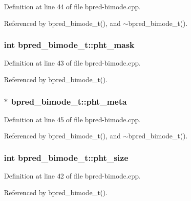 Definition at line 44 of file bpred-bimode.cpp.

Referenced by bpred\_\-bimode\_\-t(), and $\sim$bpred\_\-bimode\_\-t().
\subsubsection[{pht\_\-mask}]{\setlength{\rightskip}{0pt plus 5cm}int {\bf bpred\_\-bimode\_\-t::pht\_\-mask}\hspace{0.3cm}{\tt  [protected]}}\label{classbpred__bimode__t_26046f46378232e197b7b46dd48a1f72}




Definition at line 43 of file bpred-bimode.cpp.

Referenced by bpred\_\-bimode\_\-t().
\subsubsection[{pht\_\-meta}]{$\ast$ {\bf bpred\_\-bimode\_\-t::pht\_\-meta}\hspace{0.3cm}{\tt  [protected]}}\label{classbpred__bimode__t_9d5886c56147b19aa8376ba3d76145a3}




Definition at line 45 of file bpred-bimode.cpp.

Referenced by bpred\_\-bimode\_\-t(), and $\sim$bpred\_\-bimode\_\-t().
\subsubsection[{pht\_\-size}]{\setlength{\rightskip}{0pt plus 5cm}int {\bf bpred\_\-bimode\_\-t::pht\_\-size}\hspace{0.3cm}{\tt  [protected]}}\label{classbpred__bimode__t_0ece9e64cda7680e3f674f5949f13c72}




Definition at line 42 of file bpred-bimode.cpp.

Referenced by bpred\_\-bimode\_\-t().
